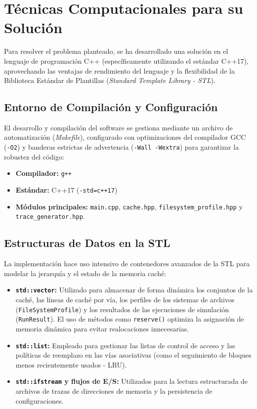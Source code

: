 \documentclass[12pt,a4paper]{article}
\begin{document}
\section{Técnicas Computacionales para su Solución}
Para resolver el problema planteado, se ha desarrollado una solución en el lenguaje de programación C++ (específicamente utilizando el estándar C++17), aprovechando las ventajas de rendimiento del lenguaje y la flexibilidad de la Biblioteca Estándar de Plantillas (\textit{Standard Template Library - STL}). 

\subsection{Entorno de Compilación y Configuración}
El desarrollo y compilación del software se gestiona mediante un archivo de automatización (\textit{Makefile}), configurado con optimizaciones del compilador GCC (\texttt{-O2}) y banderas estrictas de advertencia (\texttt{-Wall -Wextra}) para garantizar la robustez del código: 
\begin{itemize}
    \item \textbf{Compilador:} \texttt{g++}
    \item \textbf{Estándar:} C++17 (\texttt{-std=c++17})
    \item \textbf{Módulos principales:} \texttt{main.cpp}, \texttt{cache.hpp}, \texttt{filesystem\_profile.hpp} y \texttt{trace\_generator.hpp}. 
\end{itemize}

\subsection{Estructuras de Datos en la STL}
La implementación hace uso intensivo de contenedores avanzados de la STL para modelar la jerarquía y el estado de la memoria caché:
\begin{itemize}
    \item \textbf{\texttt{std::vector}:} Utilizado para almacenar de forma dinámica los conjuntos de la caché, las líneas de caché por vía, los perfiles de los sistemas de archivos (\texttt{FileSystemProfile}) y los resultados de las ejecuciones de simulación (\texttt{RunResult}). El uso de métodos como \texttt{reserve()} optimiza la asignación de memoria dinámica para evitar realocaciones innecesarias. 
    \item \textbf{\texttt{std::list}:} Empleado para gestionar las listas de control de acceso y las políticas de reemplazo en las vías asociativas (como el seguimiento de bloques menos recientemente usados - LRU).
    \item \textbf{\texttt{std::ifstream} y flujos de E/S:} Utilizados para la lectura estructurada de archivos de trazas de direcciones de memoria y la persistencia de configuraciones. 
\end{itemize}
\end{document}
